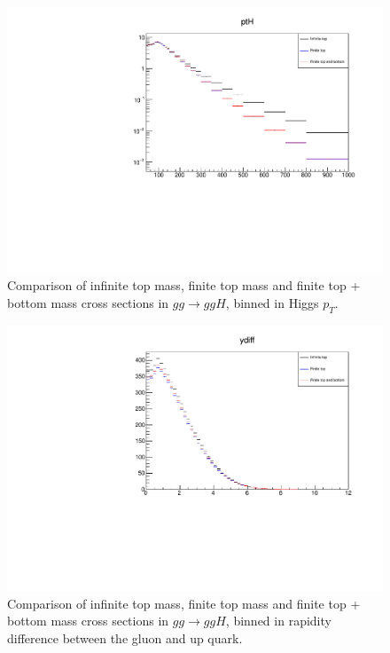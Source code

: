 \begin{figure}[H]
\centering
\includegraphics[scale=0.7]{Images/ptH_gg.pdf}
\caption{Comparison of infinite top mass, finite top mass and finite top + bottom mass cross sections in $gg \to ggH$, binned in Higgs $p_T$. }
\label{fig:pth_gg}
\end{figure}

\begin{figure}[H]
\centering
\includegraphics[scale=0.7]{Images/ydiff_gg.pdf}
\caption{Comparison of infinite top mass, finite top mass and finite top + bottom mass cross sections in $gg \to ggH$, binned in rapidity difference between the gluon and up quark.}
\label{fig:ydiff_gg}
\end{figure}

